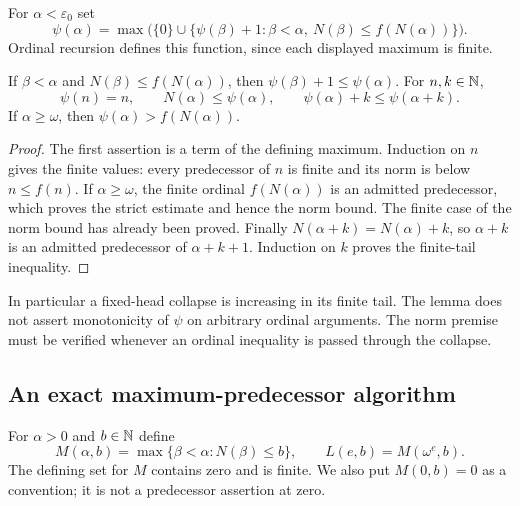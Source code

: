 \begin{definition}\label{f:def:collapse}
For $\alpha<\varepsilon_0$ set
\[
 \psi(\alpha)=\max\bigl(\{0\}\cup
   \{\psi(\beta)+1:\beta<\alpha,
                    \ N(\beta)\le f(N(\alpha))\}\bigr).
\]
Ordinal recursion defines this function, since each displayed maximum
is finite.
\end{definition}

\begin{lemma}\label{f:lem:collapse-estimates}
If $\beta<\alpha$ and $N(\beta)\le f(N(\alpha))$, then
$\psi(\beta)+1\le\psi(\alpha)$.  For $n,k\in\mathbb N$,
\[
 \psi(n)=n,\qquad N(\alpha)\le\psi(\alpha),\qquad
 \psi(\alpha)+k\le\psi(\alpha+k).
\]
If $\alpha\ge\omega$, then $\psi(\alpha)>f(N(\alpha))$.
\end{lemma}
\begin{proof}
The first assertion is a term of the defining maximum.  Induction on
$n$ gives the finite values: every predecessor of $n$ is finite and
its norm is below $n\le f(n)$.  If $\alpha\ge\omega$, the finite
ordinal $f(N(\alpha))$ is an admitted predecessor, which proves the
strict estimate and hence the norm bound.  The finite case of the norm
bound has already been proved.  Finally $N(\alpha+k)=N(\alpha)+k$,
so $\alpha+k$ is an admitted predecessor of $\alpha+k+1$.
Induction on $k$ proves the finite-tail inequality.
\end{proof}

In particular a fixed-head collapse is increasing in its finite tail.
The lemma does not assert monotonicity of $\psi$ on arbitrary ordinal
arguments.  The norm premise must be verified whenever an ordinal
inequality is passed through the collapse.

\subsection{An exact maximum-predecessor algorithm}

For $\alpha>0$ and $b\in\mathbb N$ define
\[
 M(\alpha,b)=\max\{\beta<\alpha:N(\beta)\le b\},\qquad
 L(e,b)=M(\omega^e,b).
\]
The defining set for $M$ contains zero and is finite.  We also put
$M(0,b)=0$ as a convention; it is not a predecessor assertion at zero.


